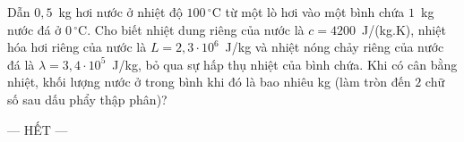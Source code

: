 	\begin{ex}%
		Dẫn $0{,}5$~kg hơi nước ở nhiệt độ $100\,^\circ\text{C}$ từ một lò hơi vào một bình chứa $1$~kg nước đá ở $0\,^\circ\text{C}$. Cho biết nhiệt dung riêng của nước là $c=4200$~J/(kg.K), nhiệt hóa hơi riêng của nước là $L=2{,}3\cdot 10^6$~J/kg và nhiệt nóng chảy riêng của nước đá là $\lambda=3{,}4\cdot 10^5$~J/kg, bỏ qua sự hấp thụ nhiệt của bình chứa. Khi có cân bằng nhiệt, khối lượng nước ở trong bình khi đó là bao nhiêu kg (làm tròn đến $2$ chữ số sau dấu phẩy thập phân)?
		\par
	\end{ex}

	\centerline{--- HẾT ---}


